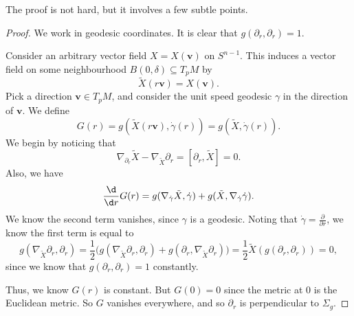 \documentclass[a4paper]{article}
\begin{document}
The proof is not hard, but it involves a few subtle points.
\begin{proof}
  We work in geodesic coordinates. It is clear that $g(\partial_r, \partial_r) = 1$.

  Consider an arbitrary vector field $X = X(\mathbf{v})$ on $S^{n - 1}$. This induces a vector field on some neighbourhood $B(0, \delta) \subseteq T_p M$ by
  \[
    \tilde{X}(r\mathbf{v}) = X(\mathbf{v}).
  \]
  Pick a direction $\mathbf{v} \in T_pM$, and consider the unit speed geodesic $\gamma$ in the direction of $\mathbf{v}$. We define
  \[
    G(r) = g(\tilde{X}(r\mathbf{v}), \dot{\gamma}(r)) = g(\tilde{X}, \dot{\gamma}(r)).
  \]
  We begin by noticing that
  \[
    \nabla_{\partial_r} \tilde{X} - \nabla_{\tilde{X}} \partial_r = [\partial_r , \tilde{X}] = 0.
  \]
  Also, we have
  \[
    \frac{\d}{\d r} G(r) = g(\nabla_{\dot{\gamma}} \tilde{X}, \dot{\gamma}) + g(\tilde{X}, \nabla_{\dot{\gamma}} \dot{\gamma}).
  \]
  We know the second term vanishes, since $\gamma$ is a geodesic. Noting that $\dot{\gamma} = \frac{\partial}{\partial r}$, we know the first term is equal to
  \[
    g(\nabla_{\tilde{X}} \partial_r, \partial_r) = \frac{1}{2} \Big(g(\nabla_{\tilde{X}} \partial_r, \partial_r) + g( \partial_r, \nabla_{\tilde{X}}\partial_r)\Big) = \frac{1}{2} \tilde{X} (g(\partial_r, \partial_r)) = 0,
  \]
  since we know that $g(\partial_r, \partial_r) = 1$ constantly.

  Thus, we know $G(r)$ is constant. But $G(0) = 0$ since the metric at $0$ is the Euclidean metric. So $G$ vanishes everywhere, and so $\partial_r$ is perpendicular to $\Sigma_g$.


\end{proof}
\end{document}
